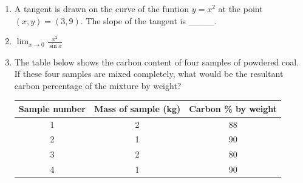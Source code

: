\documentclass[journal]{IEEEtran}
\begin{document}
\begin{enumerate}[start=1]
\item A tangent is drawn on the curve of the funtion $y = x^2$ at the point $(x,y)=(3,9)$. The slope of the tangent is \_\_\_\_.
\hfill{}
\begin{enumerate}
\end{enumerate}

\item $\lim_{x \to 0}{\frac{x^2}{\sin{x}}}$
\hfill{}
\begin{enumerate}
\end{enumerate}

\item The table below shows the carbon content of four samples of powdered coal. If these four samples are mixed completely, what would be the resultant carbon percentage of the mixture by weight?

\begin{table}[h!]
\centering
\begin{tabular}{|c|c|c|}
\hline
Sample number & Mass of sample (kg) & Carbon \% by weight \\ \hline
1 & 2 & 88 \\ \hline
2 & 1 & 90 \\ \hline
3 & 2 & 80 \\ \hline
4 & 1 & 90 \\ \hline
\end{tabular}
\end{table}


\end{enumerate}
\end{document}
